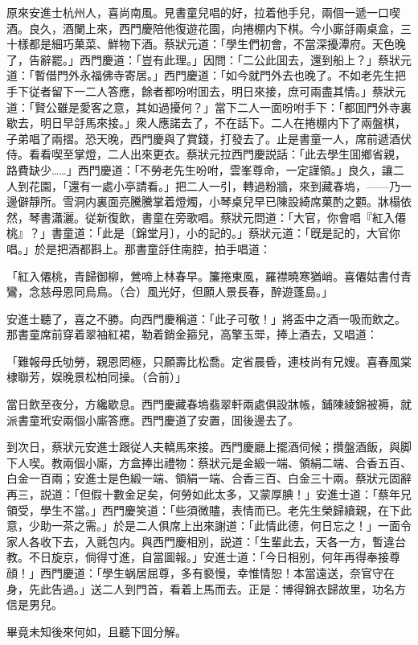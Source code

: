 原來安進士杭州人，喜尚南風。見書童兒唱的好，拉着他手兒，兩個一遞一口喫酒。良久，酒闌上來，西門慶陪他復遊花園，向捲棚内下棋。今小廝㧱兩桌盒，三十樣都是細巧菓菜、鮮物下酒。蔡狀元道：「學生們初會，不當深擾潭府。天色晚了，告辭罷。」西門慶道：「豈有此理。」因問：「二公此囬去，還到船上？」蔡狀元道：「暫借門外永福佛寺寄居。」西門慶道：「如今就門外去也晚了。不如老先生把手下従者留下一二人答應，餘者都吩咐囬去，明日來接，庶可兩盡其情。」蔡狀元道：「賢公雖是愛客之意，其如過擾何？」當下二人一面吩咐手下：「都囬門外寺裏歇去，明日早㧱馬來接。」衆人應諾去了，不在話下。二人在捲棚内下了兩盤棋，子弟唱了兩摺。恐天晚，西門慶與了賞錢，打發去了。止是書童一人，席前遞酒伏侍。看看喫至掌燈，二人出來更衣。蔡狀元拉西門慶説話：「此去學生囬鄉省親，路費缺少……」西門慶道：「不勞老先生吩咐，雲峯尊命，一定謹領。」良久，讓二人到花園，「還有一處小亭請看。」把二人一引，轉過粉牆，來到藏春塢，——乃一邊僻靜所。雪洞内裏面亮騰騰掌着燈燭，小琴桌兒早已陳設綺席菓酌之䫫。牀榻依然，琴書瀟灑。従新復飲，書童在旁歌唱。蔡狀元問道：「大官，你會唱『紅入僊桃』？」書童道：「此是〔錦堂月〕，小的記的。」蔡狀元道：「旣是記的，大官你唱。」於是把酒都斟上。那書童㧱住南腔，拍手唱道：

\begin{myquote}
「紅入僊桃，青歸御柳，鶯啼上林春早。簾捲東風，羅襟曉寒猶峭。喜僊姑書付青鸞，念慈母恩同烏鳥。{\marktext\small（合）}風光好，但願人景長春，醉遊蓬島。」
\end{myquote}

安進士聽了，喜之不勝。向西門慶稱道：「此子可敬！」將盃中之酒一吸而飲之。那書童席前穿着翠袖紅裙，勒着銷金箍兒，高擎玉斝，捧上酒去，又唱道：

\begin{myquote}
「難報母氏劬勞，親恩罔極，只願壽比松喬。定省晨昏，連枝尚有兄嫂。喜春風棠棣聯芳，娱晚景松柏同操。{\marktext\small（合前）}」
\end{myquote}

當日飲至夜分，方纔歇息。西門慶藏春塢翡翠軒兩處俱設牀帳，鋪陳綾錦被褥，就派書童玳安兩個小廝答應。西門慶道了安置，囬後邊去了。

到次日，蔡狀元安進士跟従人夫轎馬來接。西門慶廳上擺酒伺候；攢盤酒飯，與脚下人喫。教兩個小廝，方盒捧出禮物：蔡狀元是金緞一端、領絹二端、合香五百、白金一百兩；安進士是色緞一端、領絹一端、合香三百、白金三十兩。蔡狀元固辭再三，説道：「但假十數金足矣，何勞如此太多，又蒙厚腆！」安進士道：「蔡年兄領受，學生不當。」西門慶笑道：「些須微贐，表情而已。老先生榮歸續親，在下此意，少助一茶之需。」於是二人俱席上出來謝道：「此情此德，何日忘之！」一面令家人各收下去，入氈包内。與西門慶相別，説道：「生輩此去，天各一方，暫違台教。不日旋京，倘得寸進，自當圖報。」安進士道：「今日相别，何年再得奉接尊顔！」西門慶道：「學生蜗居屈尊，多有褻慢，幸惟情恕！本當遠送，奈官守在身，先此告過。」送二人到門首，看着上馬而去。正是：博得錦衣歸故里，功名方信是男兒。

畢竟未知後來何如，且聽下囬分解。

